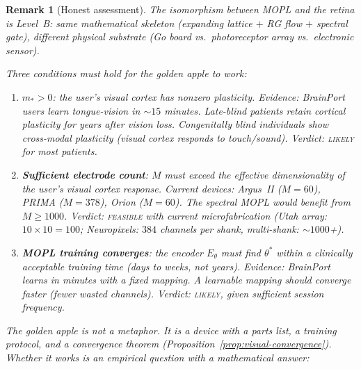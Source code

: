 \documentclass[11pt,a4paper]{article}
\newtheorem{remark}[theorem]{Remark}
\begin{document}
\begin{remark}[Honest assessment]\label{rem:golden-honest}
The isomorphism between MOPL and the retina is
Level~B: same mathematical skeleton (expanding lattice
$+$ RG flow $+$ spectral gate), different physical
substrate (Go board vs.\ photoreceptor array vs.\
electronic sensor).

Three conditions must hold for the golden apple to work:
\begin{enumerate}[nosep]
\item \textbf{$m_* > 0$}: the user's visual cortex has
  nonzero plasticity.
  Evidence: BrainPort users learn tongue-vision in
  $\sim\!15$ minutes.
  Late-blind patients retain cortical plasticity for
  years after vision loss.
  Congenitally blind individuals show cross-modal
  plasticity (visual cortex responds to touch/sound).
  Verdict: \textsc{likely} for most patients.

\item \textbf{Sufficient electrode count}: $M$ must exceed
  the effective dimensionality of the user's visual cortex
  response.
  Current devices: Argus~II ($M = 60$),
  PRIMA ($M = 378$), Orion ($M = 60$).
  The spectral MOPL would benefit from
  $M \geq 1000$.
  Verdict: \textsc{feasible} with current
  microfabrication (Utah array: $10 \times 10 = 100$;
  Neuropixels: $384$ channels per shank,
  multi-shank: $\sim\!1000$+).

\item \textbf{MOPL training converges}: the encoder
  $E_\theta$ must find $\theta^*$ within a clinically
  acceptable training time (days to weeks, not years).
  Evidence: BrainPort learns in minutes with a
  fixed mapping.  A learnable mapping should converge
  faster (fewer wasted channels).
  Verdict: \textsc{likely}, given sufficient
  session frequency.
\end{enumerate}

The golden apple is not a metaphor.
It is a device with a parts list, a training protocol,
and a convergence theorem
(Proposition~\ref{prop:visual-convergence}).
Whether it works is an empirical question with a
mathematical answer:

\medskip
\begin{center}
\end{center}
\end{remark}
\end{document}
